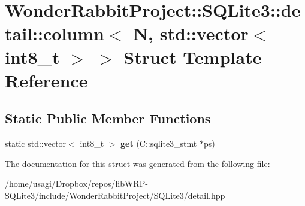 \hypertarget{structWonderRabbitProject_1_1SQLite3_1_1detail_1_1column_3_01N_00_01std_1_1vector_3_01int8__t_01_4_01_4}{\section{Wonder\-Rabbit\-Project\-:\-:S\-Q\-Lite3\-:\-:detail\-:\-:column$<$ N, std\-:\-:vector$<$ int8\-\_\-t $>$ $>$ Struct Template Reference}
\label{structWonderRabbitProject_1_1SQLite3_1_1detail_1_1column_3_01N_00_01std_1_1vector_3_01int8__t_01_4_01_4}
}
\subsection*{Static Public Member Functions}
\begin{DoxyCompactItemize}
\item 
\hypertarget{structWonderRabbitProject_1_1SQLite3_1_1detail_1_1column_3_01N_00_01std_1_1vector_3_01int8__t_01_4_01_4_a31a03df5d0885939ae214543f9b5aee8}{static std\-::vector$<$ int8\-\_\-t $>$ {\bfseries get} (C\-::sqlite3\-\_\-stmt $\ast$ps)}\label{structWonderRabbitProject_1_1SQLite3_1_1detail_1_1column_3_01N_00_01std_1_1vector_3_01int8__t_01_4_01_4_a31a03df5d0885939ae214543f9b5aee8}

\end{DoxyCompactItemize}


The documentation for this struct was generated from the following file\-:\begin{DoxyCompactItemize}
\item 
/home/usagi/\-Dropbox/repos/lib\-W\-R\-P-\/\-S\-Q\-Lite3/include/\-Wonder\-Rabbit\-Project/\-S\-Q\-Lite3/detail.\-hpp\end{DoxyCompactItemize}
